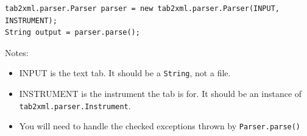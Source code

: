 \documentclass[11pt]{article}
\begin{document}
\begin{verbatim}
tab2xml.parser.Parser parser = new tab2xml.parser.Parser(INPUT, INSTRUMENT);  
String output = parser.parse();  
\end{verbatim}

Notes:
\begin{itemize}
\item INPUT is the text tab.  It should be a \texttt{String}, not a file.
\item INSTRUMENT is the instrument the tab is for.  It should be an instance of \texttt{tab2xml.parser.Instrument}.
\item You will need to handle the checked exceptions thrown by \texttt{Parser.parse()}
\end{itemize}
\end{document}
